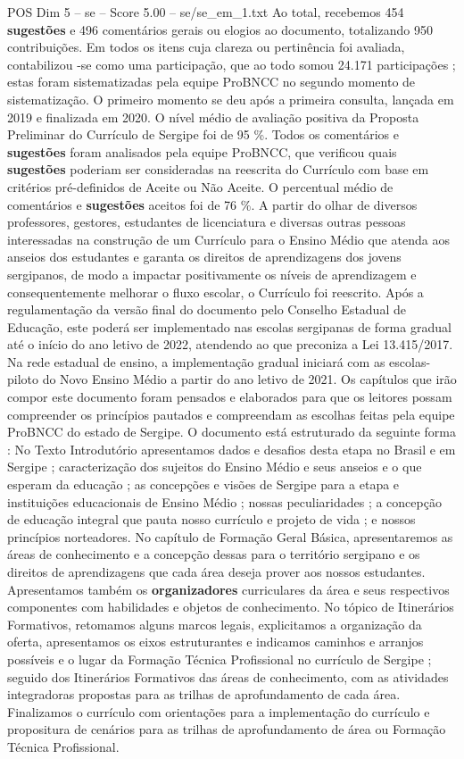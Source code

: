 \begin{textsample}{POS Dim 5 – se – Score 5.00 – se/se\_em\_1.txt}
Ao total, recebemos 454 \textbf{sugestões} e 496 comentários gerais ou elogios ao documento, totalizando 950 contribuições.
Em todos os itens cuja clareza ou pertinência foi avaliada, contabilizou -se como uma participação, que ao todo somou 24.171 participações ; estas foram sistematizadas pela equipe ProBNCC no segundo momento de sistematização.
O primeiro momento se deu após a primeira consulta, lançada em 2019 e finalizada em 2020.
O nível médio de avaliação positiva da Proposta Preliminar do Currículo de Sergipe foi de 95 \%.
Todos os comentários e \textbf{sugestões} foram analisados pela equipe ProBNCC, que verificou quais \textbf{sugestões} poderiam ser consideradas na reescrita do Currículo com base em critérios pré-definidos de Aceite ou Não Aceite.
O percentual médio de comentários e \textbf{sugestões} aceitos foi de 76 \%.
A partir do olhar de diversos professores, gestores, estudantes de licenciatura e diversas outras pessoas interessadas na construção de um Currículo para o Ensino Médio que atenda aos anseios dos estudantes e garanta os direitos de aprendizagens dos jovens sergipanos, de modo a impactar positivamente os níveis de aprendizagem e consequentemente melhorar o fluxo escolar, o Currículo foi reescrito.
Após a regulamentação da versão final do documento pelo Conselho Estadual de Educação, este poderá ser implementado nas escolas sergipanas de forma gradual até o início do ano letivo de 2022, atendendo ao que preconiza a Lei 13.415/2017.
Na rede estadual de ensino, a implementação gradual iniciará com as escolas-piloto do Novo Ensino Médio a partir do ano letivo de 2021.
Os capítulos que irão compor este documento foram pensados e elaborados para que os leitores possam compreender os princípios pautados e compreendam as escolhas feitas pela equipe ProBNCC do estado de Sergipe.
O documento está estruturado da seguinte forma : No Texto Introdutório apresentamos dados e desafios desta etapa no Brasil e em Sergipe ; caracterização dos sujeitos do Ensino Médio e seus anseios e o que esperam da educação ; as concepções e visões de Sergipe para a etapa e instituições educacionais de Ensino Médio ; nossas peculiaridades ; a concepção de educação integral que pauta nosso currículo e projeto de vida ; e nossos princípios norteadores.
No capítulo de Formação Geral Básica, apresentaremos as áreas de conhecimento e a concepção dessas para o território sergipano e os direitos de aprendizagens que cada área deseja prover aos nossos estudantes.
Apresentamos também os \textbf{organizadores} curriculares da área e seus respectivos componentes com habilidades e objetos de conhecimento.
No tópico de Itinerários Formativos, retomamos alguns marcos legais, explicitamos a organização da oferta, apresentamos os eixos estruturantes e indicamos caminhos e arranjos possíveis e o lugar da Formação Técnica Profissional no currículo de Sergipe ; seguido dos Itinerários Formativos das áreas de conhecimento, com as atividades integradoras propostas para as trilhas de aprofundamento de cada área.
Finalizamos o currículo com orientações para a implementação do currículo e propositura de cenários para as trilhas de aprofundamento de área ou Formação Técnica Profissional.

\end{textsample}
